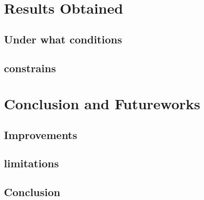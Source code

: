 \documentclass{article}
\begin{document}
\newpage
\section{Results Obtained}
\subsection{Under what conditions}
\subsection{constrains}

\newpage
\section{Conclusion and Futureworks}
\subsection{Improvements}
\subsection{limitations}
\subsection{Conclusion}



\newpage
\end{document}
